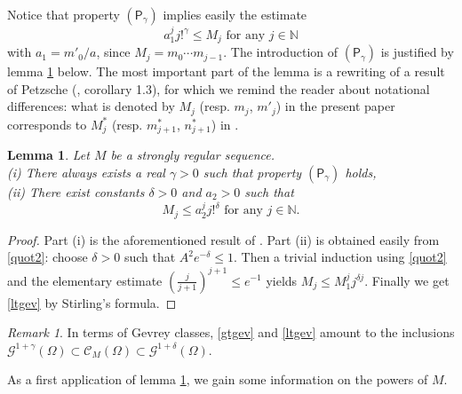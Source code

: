 \documentclass[a4paper]{amsart}
\theoremstyle{plain}
\newtheorem{lem}[subsubsection]{Lemma}
\theoremstyle{definition}
\theoremstyle{remark}
\newtheorem{rem}[subsubsection]{Remark}
\begin{document}
Notice that property $ (\mathsf{P}_\gamma) $ implies easily the estimate
\begin{equation}\label{gtgev}
a_1^j j!^{\gamma}\leq M_j\text{ for any }j\in\mathbb{N}
\end{equation}
with $ a_1=m'_0/a $, since $ M_j=m_0\cdots m_{j-1} $. 
The introduction of $ (\mathsf{P}_\gamma) $ is justified by lemma \ref{growth} below. The most important part of the lemma is a rewriting of a result of Petzsche (\cite{Pet}, corollary 1.3), for which we remind the reader about notational differences: what is denoted by $ M_j $ (resp. $ m_j $, $ m'_j $) in the present paper corresponds to $ M^*_j $ (resp. $ m^*_{j+1} $, $ n^*_{j+1} $) in \cite{Pet}. 

\begin{lem}\label{growth}
Let $ M $ be a strongly regular sequence.\\
(i) There always exists a real $ \gamma>0 $ such that property  $ (\mathsf{P}_\gamma) $ holds,\\
(ii) There exist constants $ \delta>0 $ and $ a_2>0 $ such that
\begin{equation}\label{ltgev}
M_j\leq a_2^j j!^{\delta}\text{ for any } j\in\mathbb{N}.
\end{equation}
\end{lem}
\begin{proof} Part (i) is the aforementioned result of \cite{Pet}. 
Part (ii) is obtained easily from \eqref{quot2}: choose $ \delta>0 $ such that $ A^2e^{-\delta}\leq 1. $ Then a trivial induction using \eqref{quot2} and the elementary estimate $ (\frac{j}{j+1})^{j+1}\leq e^{-1} $ yields $ M_j\leq M_1^j j^{\delta j} $. Finally we get \eqref{ltgev} by Stirling's formula.
\end{proof}

\begin{rem} In terms of Gevrey classes, \eqref{gtgev} and
\eqref{ltgev} amount to the inclusions 
$ \mathcal{G}^{1+\gamma}(\Omega)\subset \mathcal{C}_M(\Omega)\subset\mathcal{G}^{1+\delta}(\Omega) $.
\end{rem}

As a first application of lemma \ref{growth}, we gain some information on the powers
of $ M $.
\end{document}
